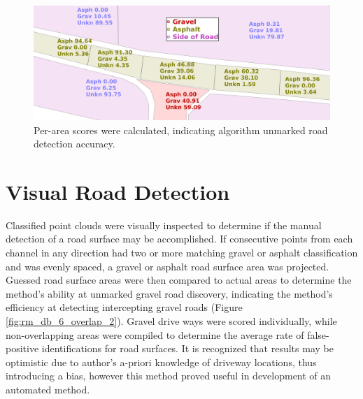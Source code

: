 \documentclass[numbered,pdftex]{ohio-etd}
\begin{document}
{{		\begin{figure}[H]
			\centering
			\includegraphics[width=0.90\linewidth]{Defense_Images/rm_db_1_area_score}
			\caption[Area Scores]{Per-area scores were calculated, indicating algorithm unmarked road detection accuracy. }
			\label{fig:rm_db_1_area_score}
		\end{figure}

		
	}

	\section{Visual Road Detection}\label{sec:manual_road_detection}{
	
		{Classified point clouds were visually inspected to determine if the manual detection of a road surface may be accomplished. If consecutive points from each channel in any direction had two or more matching gravel or asphalt classification and was evenly spaced, a gravel or asphalt road surface area was projected. Guessed road surface areas were then compared to actual areas to determine the method's ability at unmarked gravel road discovery, indicating the method's efficiency at detecting intercepting gravel roads (Figure \ref{fig:rm_db_6_overlap_2}). Gravel drive ways were scored individually, while non-overlapping areas were compiled to determine the average rate of false-positive identifications for road surfaces. It is recognized that results may be optimistic due to author's a-priori knowledge of driveway locations, thus introducing a bias, however this method proved useful in development of an automated method.}	
		
}}
\end{document}
